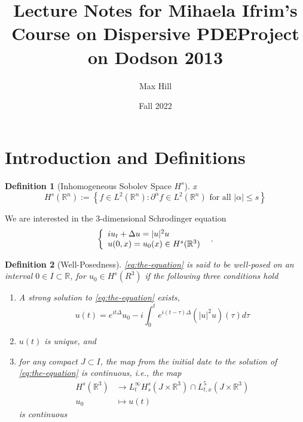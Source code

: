 \documentclass{article}
\title{Lecture Notes for Mihaela Ifrim's Course on Dispersive PDE}
\date{Fall 2022}
\makeatletter
\newtheorem{definition}{Definition}
\def\R{\mathbb{R}} %
\newcommand{\curly}[2]{\left\{ \begin{array}{l@{\quad}l}#1\\#2\end{array}\right.}
\makeatother
\begin{document}
\title{Project on Dodson 2013}
\author{Max Hill}
\newpage

\section{Introduction and Definitions}
\begin{definition}[Inhomogeneous Sobolev Space $H^{s}$]x
  \label{def:inhomogeneous-sobolev-space-hs}
  \begin{equation*}
    H^{s}(\R^n):= \left\{ f\in L^{2}(\R^n): \partial^{\alpha}f\in L^{2}(\R^n)
      \text{ for all }|\alpha| \leq s\right\}
  \end{equation*}
\end{definition}

We are interested in the 3-dimensional Schrodinger equation
\begin{equation}\label{eq:the-equation}
  \curly{iu_{t}+\Delta u=|u|^{2}u}{u(0,x)=u_{0}(x)\in H^{s}(\R^3)}.
\end{equation}

\begin{definition}[Well-Posedness]
  \cref{eq:the-equation} is said to be well-posed on an interval $0\in I\subset
  \R$, for $u_{0}\in H^{s}(R^{3})$ if the following three conditions hold
  \begin{enumerate}
    \item A strong solution to \cref{eq:the-equation} exists,
    \begin{equation}\label{eq:the-solution}
      u(t) = e^{it\Delta}u_{0}-i \int_{0}^{t}e^{i(t-\tau)\Delta}(|u|^{2}u)(\tau)d\tau 
    \end{equation}
    \item $u(t)$ is unique, and 
    \item for any compact $J \subset I$, the map from the initial date to the
    solution of \cref{eq:the-equation} is continuous, i.e., the map
    \begin{align*}
      H^{s}(\R^{3})&\to L_{t}^{\infty}H_{s}^{s}(J\times \R^{3})\cap L_{t,x}^{5}(J\times \R^{3})\\
      u_{0}&\mapsto u(t)
    \end{align*}
    is continuous
  \end{enumerate}
\end{definition}
\end{document}
